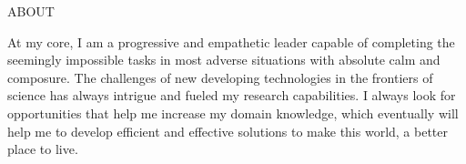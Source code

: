 \documentclass{resume} %
\begin{document}

\begin{rSection}{ABOUT}

{At my core, I am a progressive and empathetic leader capable of completing the seemingly impossible tasks in most adverse situations with absolute calm and composure. The challenges of new developing technologies in the frontiers of science has always intrigue and fueled my research capabilities. I always look for opportunities that help me increase my domain knowledge, which eventually will help me to develop efficient and effective solutions to make this world, a better place to live.}


\end{rSection}
\end{document}
